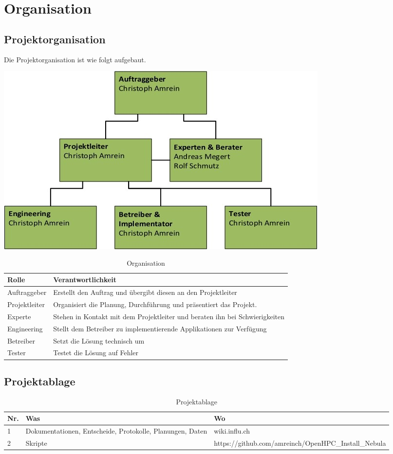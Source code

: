 \section{Organisation}
\subsection{Projektorganisation}
Die Projektorganisation ist wie folgt aufgebaut.

\includegraphics[scale=0.9]{Bilder/Projektorganisation.jpg}{\centering}

\begin{table}[H]
\centering
\begin{tabular}{p{4cm}p{10cm}}
\hline
\rowcolor{heading}\textbf{Rolle} & \textbf{Verantwortlichkeit} \\\hline
Auftraggeber & Erstellt den Auftrag und übergibt diesen an den Projektleiter \\\hline
Projektleiter & Organisiert die Planung, Durchführung und präsentiert das Projekt. \\\hline
Experte & Stehen in Kontakt mit dem Projektleiter und beraten ihn bei Schwierigkeiten \\\hline
Engineering & Stellt dem Betreiber zu implementierende Applikationen zur Verfügung \\\hline
Betreiber & Setzt die Lösung technisch um \\\hline
Tester & Testet die Lösung auf Fehler  \\\hline
\end{tabular}
\caption{Organisation}
\end{table}

\subsection{Projektablage}
\begin{table}[H]
\centering
\begin{tabular}{p{1cm}p{4cm}p{10cm}}
\hline
\rowcolor{heading}\textbf{Nr.} & \textbf{Was} & \textbf{Wo} \\\hline
1 & Dokumentationen, Entscheide, Protokolle, Planungen, Daten & wiki.influ.ch \\\hline
2 & Skripte & https://github.com/amreinch/OpenHPC\_Install\_Nebula \\\hline
\end{tabular}
\caption{Projektablage}
\end{table}

